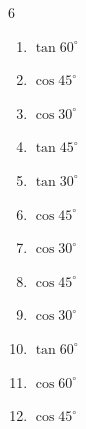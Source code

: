 \begin{multicols}{6}
\begin{enumerate}

  \item $\displaystyle \tan{60^\circ}$


  \item $\displaystyle \cos{45^\circ}$


  \item $\displaystyle \cos{30^\circ}$


  \item $\displaystyle \tan{45^\circ}$

        \phantom{$\displaystyle =1$}

\columnbreak %

  \item $\displaystyle \tan{30^\circ}$


  \item $\displaystyle \cos{45^\circ}$


  \item $\displaystyle \cos{30^\circ}$


  \item $\displaystyle \cos{45^\circ}$


  \item $\displaystyle \cos{30^\circ}$


  \item $\displaystyle \tan{60^\circ}$


  \item $\displaystyle \cos{60^\circ}$


  \item $\displaystyle \cos{45^\circ}$



\end{enumerate}
\end{multicols}
